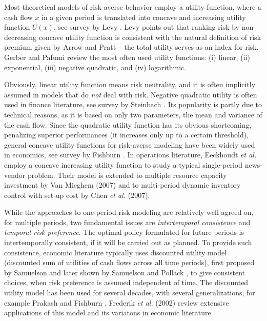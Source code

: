 \documentclass[mnsc,nonblindrev,copyedit]{informs2_wz} %
\begin{document}
Most theoretical models of risk-averse behavior employ a utility function, %
where a cash flow $x$ in a given period is translated into concave and increasing utility function $U(x)$, see survey by Levy \cite{Levy92}.  Levy points out that ranking risk by non-decreasing concave utility function is consistent with the natural definition of risk premium given by Arrow \cite{Arrow1951} and Pratt \cite{Pratt1964} -- the total utility serves as an index for risk.  Gerber and Pafumi \cite{Gerber1998} review the most often used utility functions: (i) linear, (ii) exponential, (iii) negative quadratic, and (iv) logarithmic.

Obviously, linear utility function means risk neutrality, and it is often implicitly assumed in models that do \emph{not} deal with risk.  Negative quadratic utility is often used in finance literature, see survey by Steinbach \cite{Steinbach2001}.  Its popularity is partly due to technical reasons, as it is based on only two parameters, the mean and variance of the cash flow. 
Since the quadratic utility function has its obvious shortcoming, penalizing superior performances (it increases only up to a certain threshold), general concave utility functions for risk-averse modeling have been widely used in economics, see survey by Fishburn \cite{Fishburn1989}. In operations literature, Eeckhoudt {\it et al.} \cite{Eeckhoudt1995} employ a concave increasing utility function to study a typical single-period news-vendor problem.  Their model is extended to multiple resource capacity investment by Van Mieghem (2007) and to multi-period dynamic inventory control with set-up cost by Chen {\it et al.} (2007).



While the approaches to one-period risk modeling are relatively well agreed on, for multiple periods, two fundamental issues are {\em intertemporal consistence} and {\em temporal risk preference}.  The optimal policy formulated for future periods is intertemporally consistent, if it will be carried out as planned.  %
To provide such consistence, economic literature typically uses discounted utility model (discounted sum of utilities of cash flows across all time periods), first proposed by Samuelson \cite{Samuelson1937} and later shown by Samuelson \cite{Samuelson1952} and Pollack \cite{Pollak}, to give consistent choices, when risk preference is assumed independent of time.  The discounted utility model has been used for several decades, with several generalizations, for example Prakash \cite{Prakash1976} and Fishburn \cite{Fishburn1989}.  Frederik {\it et al.} (2002) review extensive applications of this model and its variatons in economic literature. 
\end{document}
